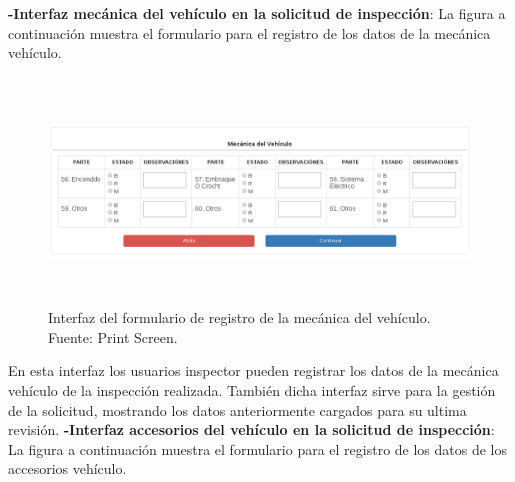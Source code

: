 \textbf{-Interfaz mecánica del vehículo en la solicitud de inspección}: La figura a continuación muestra el formulario para el registro de los datos de la mecánica vehículo.

\begin{figure}[H]
\begin{center}
	\includegraphics[width=\textwidth,height=6cm]{img/interfaces/registro_mecanica_vehiculo.png}
\end{center}
\caption{Interfaz del formulario de registro de la mecánica del vehículo. Fuente: Print Screen.}
\label{fig:interfaz_registro_mecanica_vehiculo}
\end{figure}

En esta interfaz los usuarios inspector pueden registrar los datos de la mecánica vehículo de la inspección realizada. También dicha interfaz sirve para la gestión de la solicitud, mostrando los datos anteriormente cargados para su ultima revisión.
\newpage
\textbf{-Interfaz accesorios del vehículo en la solicitud de inspección}: La figura a continuación muestra el formulario para el registro de los datos de los accesorios vehículo.

